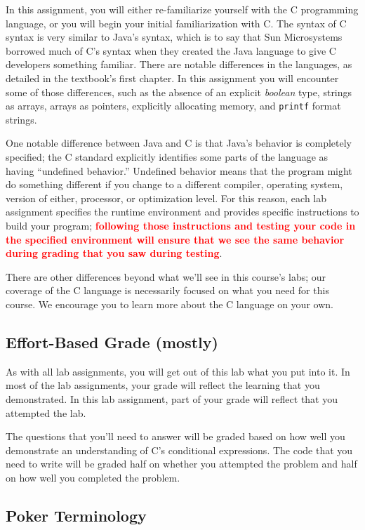 In this assignment, you will either re-familiarize yourself with the C programming language, or you will begin your initial familiarization with C\@.
The syntax of C syntax is very similar to Java's syntax, which is to say that Sun Microsystems borrowed much of C's syntax when they created the Java language to give C developers something familiar.
There are notable differences in the languages, as detailed in the textbook's first chapter.
In this assignment you will encounter some of those differences, such as the absence of an explicit \textit{boolean} type, strings as arrays, arrays as pointers, explicitly allocating memory, and \lstinline{printf} format strings.

One notable difference between Java and C is that Java's behavior is completely specified;
the C standard explicitly identifies some parts of the language as having ``undefined behavior.''
Undefined behavior means that the program might do something different if you change to a different compiler, operating system, version of either, processor, or optimization level.
For this reason, each lab assignment specifies the runtime environment and provides specific instructions to build your program;
\textcolor{red}{\textbf{following those instructions and testing your code in the specified environment will ensure that we see the same behavior during grading that you saw during testing}}.

There are other differences beyond what we'll see in this course's labs;
our coverage of the C language is necessarily focused on what you need for this course.
We encourage you to learn more about the C language on your own.

\subsection{Effort-Based Grade (mostly)}

As with all lab assignments, you will get out of this lab what you put into it.
In most of the lab assignments, your grade will reflect the learning that you demonstrated.
In this lab assignment, part of your grade will reflect that you attempted the lab.

The questions that you'll need to answer will be graded based on how well you demonstrate an understanding of C's conditional expressions.
The code that you need to write will be graded half on whether you attempted the problem and half on how well you completed the problem.

\subsection{Poker Terminology} \label{subsec:terminology}

